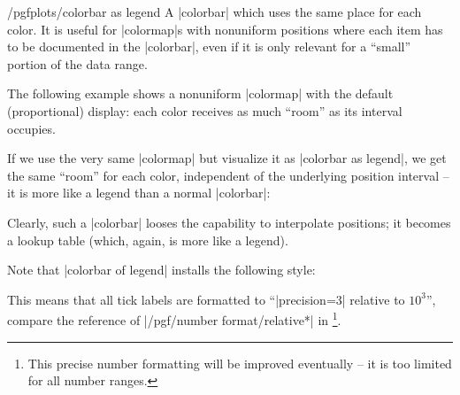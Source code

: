 \begin{stylekey}{/pgfplots/colorbar as legend}
    A |colorbar| which uses the same place for each color. It is useful for
    |colormap|s with nonuniform positions where each item has to be documented
    in the |colorbar|, even if it is only relevant for a ``small'' portion of
    the data range.

    The following example shows a nonuniform |colormap| with the default
    (proportional) display: each color receives as much ``room'' as its
    interval occupies.
\begin{codeexample}[]
\pgfplotscolorbardrawstandalone[
    colorbar style={
        ticklabel style={font=\tiny},
    },
    colormap access=const,
    colormap={CM}{
        of colormap={
            viridis,
            target pos={
                0,200,300,350,375,
                400,700,800,850,1000
            },
            sample for=const,
        },
    },
]
\end{codeexample}

    If we use the very same |colormap| but visualize it as
    |colorbar as legend|, we get the same ``room'' for each color, independent
    of the underlying position interval -- it is more like a legend than a
    normal |colorbar|:
\begin{codeexample}[]
\pgfplotscolorbardrawstandalone[
    colorbar as legend,
    colorbar style={
        ticklabel style={font=\tiny},
    },
    colormap access=const,
    colormap={CM}{
        of colormap={
            viridis,
            target pos={
                0,200,300,350,375,
                400,700,800,850,1000
            },
            sample for=const,
        },
    },
]
\end{codeexample}
    \noindent Clearly, such a |colorbar| looses the capability to interpolate
    positions; it becomes a lookup table (which, again, is more like a legend).

    Note that |colorbar of legend| installs the following style:
\begin{codeexample}
\end{codeexample}
    \noindent This means that all tick labels are formatted to ``|precision=3|
    relative to $10^3$'', compare the reference of
    |/pgf/number format/relative*| in \PGFPlotstable{}\footnote{This precise
    number formatting will be improved eventually -- it is too limited for all
    number ranges.}.



\end{stylekey}
